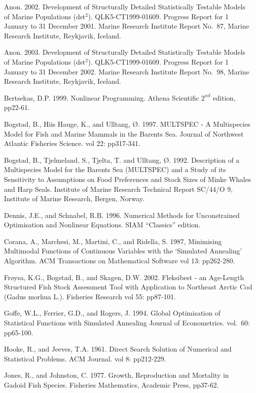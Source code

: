 \documentclass[]{book}
\begin{document}
Anon. 2002. Development of Structurally Detailed Statistically Testable
Models of Marine Populations (dst\(^{2}\)). QLK5-CT1999-01609. Progress
Report for 1 January to 31 December 2001. Marine Research Institute
Report No.~87, Marine Research Institute, Reykjavik, Iceland.

Anon. 2003. Development of Structurally Detailed Statistically Testable
Models of Marine Populations (dst\(^{2}\)). QLK5-CT1999-01609. Progress
Report for 1 January to 31 December 2002. Marine Research Institute
Report No.~98, Marine Research Institute, Reykjavik, Iceland.

Bertsekas, D.P. 1999. Nonlinear Programming. Athena Scientific \(2^{nd}\)
edition, pp22-61.

Bogstad, B., Hiis Hauge, K., and Ulltang, Ø. 1997. MULTSPEC - A
Multispecies Model for Fish and Marine Mammals in the Barents Sea.
Journal of Northwest Atlantic Fisheries Science. vol 22: pp317-341.

Bogstad, B., Tjelmeland, S., Tjelta, T. and Ulltang, Ø. 1992.
Description of a Multispecies Model for the Barents Sea (MULTSPEC) and a
Study of its Sensitivity to Assumptions on Food Preferences and Stock
Sizes of Minke Whales and Harp Seals. Institute of Marine Research
Technical Report SC/44/O 9, Institute of Marine Research, Bergen,
Norway.

Dennis, J.E., and Schnabel, R.B. 1996. Numerical Methods for
Unconstrained Optimisation and Nonlinear Equations. SIAM ``Classics''
edition.

Corana, A., Marchesi, M., Martini, C., and Ridella, S. 1987, Minimising
Multimodal Functions of Continuous Variables with the `Simulated
Annealing' Algorithm. ACM Transactions on Mathematical Software vol 13:
pp262-280.

Frøysa, K.G., Bogstad, B., and Skagen, D.W. 2002. Fleksibest - an
Age-Length Structured Fish Stock Assessment Tool with Application to
Northeast Arctic Cod (Gadus morhua L.). Fisheries Research vol 55:
pp87-101.

Goffe, W.L., Ferrier, G.D., and Rogers, J. 1994. Global Optimisation of
Statistical Functions with Simulated Annealing Journal of Econometrics.
vol.~60: pp65-100.

Hooke, R., and Jeeves, T.A. 1961. Direct Search Solution of Numerical
and Statistical Problems. ACM Journal. vol 8: pp212-229.

Jones, R., and Johnston, C. 1977. Growth, Reproduction and Mortality in
Gadoid Fish Species. Fisheries Mathematics, Academic Press, pp37-62.
\end{document}
